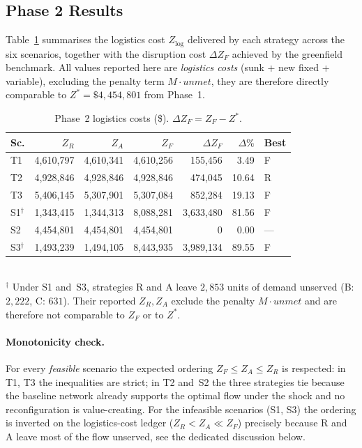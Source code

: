 \subsection{Phase 2 Results}
\label{sec:phase2_results}

Table~\ref{tab:phase2_results} summarises the logistics cost
$Z_{\text{log}}$ delivered by each strategy across the six scenarios,
together with the disruption cost $\Delta Z_F$ achieved by the
greenfield benchmark. All values reported here are
\emph{logistics costs} (sunk + new fixed + variable), excluding the
penalty term $M \cdot \mathit{unmet}$, they are therefore directly
comparable to $Z^* = \$4{,}454{,}801$ from Phase~1.

\begin{table}[H]
\centering
\caption{Phase~2 logistics costs (\$). $\Delta Z_F = Z_F - Z^*$.}
\label{tab:phase2_results}
\small
\setlength{\tabcolsep}{3pt}
\begin{tabular}{lrrrrrl}
\toprule
\textbf{Sc.} & $Z_R$ & $Z_A$ & $Z_F$ & $\Delta Z_F$ & $\Delta\%$ & \textbf{Best} \\
\midrule
T1 & 4{,}610{,}797 & 4{,}610{,}341 & 4{,}610{,}256 &   155{,}456 &   3.49 & F \\
T2 & 4{,}928{,}846 & 4{,}928{,}846 & 4{,}928{,}846 &   474{,}045 &  10.64 & R \\
T3 & 5{,}406{,}145 & 5{,}307{,}901 & 5{,}307{,}084 &   852{,}284 &  19.13 & F \\
S1$^\dagger$ & 1{,}343{,}415 & 1{,}344{,}313 & 8{,}088{,}281 & 3{,}633{,}480 &  81.56 & F \\
S2 & 4{,}454{,}801 & 4{,}454{,}801 & 4{,}454{,}801 &           0 &   0.00 & --- \\
S3$^\dagger$ & 1{,}493{,}239 & 1{,}494{,}105 & 8{,}443{,}935 & 3{,}989{,}134 &  89.55 & F \\
\bottomrule
\end{tabular}\\
\footnotesize
$^\dagger$ Under S1 and~S3, strategies R and A leave $2{,}853$ units
of demand unserved (B: $2{,}222$, C: $631$). Their reported
$Z_R, Z_A$ exclude the penalty $M\cdot\mathit{unmet}$ and are
therefore not comparable to $Z_F$ or to $Z^*$.
\end{table}

\paragraph{Monotonicity check.}
For every \emph{feasible} scenario the expected ordering
$Z_F \leq Z_A \leq Z_R$ is respected: in T1, T3 the inequalities are
strict; in T2 and~S2 the three strategies tie because the baseline
network already supports the optimal flow under the shock and no
reconfiguration is value-creating. For the infeasible scenarios
(S1, S3) the ordering is inverted on the logistics-cost ledger
($Z_R < Z_A \ll Z_F$) precisely because R and A leave most of the
flow unserved, see the dedicated discussion below.


